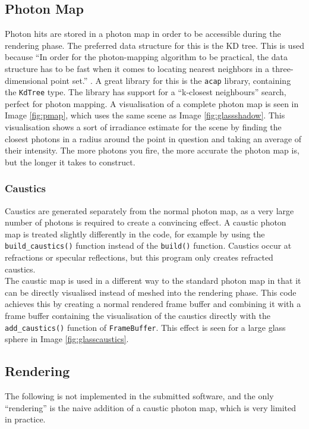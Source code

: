 \documentclass[a4paper]{article}
\begin{document}
\subsection{Photon Map}
Photon hits are stored in a photon map in order to be accessible during the rendering phase. The preferred data structure for this is the KD tree. This is used because ``In order for the photon-mapping algorithm to
be practical, the data structure has to be fast when it comes to locating
nearest neighbors in a three-dimensional point set.'' \cite{Jensen2001RealisticIS}. A great library for this is the \texttt{acap} library, containing the \texttt{KdTree} type. The library has support for a ``k-closest neighbours'' search, perfect for photon mapping. A visualisation of a complete photon map is seen in Image \ref{fig:pmap}, which uses the same scene as Image \ref{fig:glassshadow}. This visualisation shows a sort of irradiance estimate for the scene by finding the closest photons in a radius around the point in question and taking an average of their intensity. The more photons you fire, the more accurate the photon map is, but the longer it takes to construct.

\subsubsection{Caustics}
Caustics are generated separately from the normal photon map, as a very large number of photons is required to create a convincing effect. A caustic photon map is treated slightly differently in the code, for example by using the \texttt{build\_caustics()} function instead of the \texttt{build()} function. Caustics occur at refractions or specular reflections, but this program only creates refracted caustics.\\

The caustic map is used in a different way to the standard photon map in that it can be directly visualised instead of meshed into the rendering phase. This code achieves this by creating a normal rendered frame buffer and combining it with a frame buffer containing the visualisation of the caustics directly with the \texttt{add\_caustics()} function of \texttt{FrameBuffer}. This effect is seen for a large glass sphere in Image \ref{fig:glasscaustics}.

\subsection{Rendering}
The following is not implemented in the submitted software, and the only ``rendering'' is the naive addition of a caustic photon map, which is very limited in practice.\\
\end{document}
